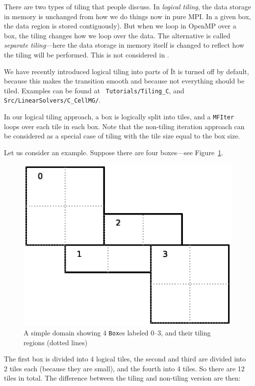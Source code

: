 There are two types of tiling that people discuss.  In {\em logical
tiling}, the data storage in memory is unchanged from how we do things
now in pure MPI.  In a given box, the data region is stored
contiguously).  But when we loop in OpenMP over a box, the tiling
changes how we loop over the data.  The alternative is called {\em
separate tiling}---here the data storage in memory itself is changed
to reflect how the tiling will be performed.  This is not considered
in \boxlib.

We have recently introduced logical tiling into parts of \boxlib\.  It
is turned off by default, because this makes the transition smooth and
because not everything should be tiled.  Examples can be found at {\tt
  Tutorials/Tiling\_C}, and {\tt Src/LinearSolvers/C\_CellMG/}.

In our logical tiling approach, a box is logically split into tiles,
and a {\tt MFIter} loops over each tile in each box.  Note that the
non-tiling iteration approach can be considered as a special case of
tiling with the tile size equal to the box size.

Let us consider an example.  Suppose there are four boxes---see
Figure~\ref{fig:domain-tiling}.
\begin{figure}[t]
\centering
\includegraphics[width=0.8\linewidth]{domain-tile}
\caption{\label{fig:domain-tiling} A simple domain showing 4
  {\tt Box}es labeled 0--3, and their tiling regions (dotted lines)}
\end{figure}
%
The first box is divided into 4 logical tiles, the second and third
are divided into 2 tiles each (because they are small), and the fourth
into 4 tiles.  So there are 12 tiles in total.  The difference between
the tiling and non-tiling version are then:

